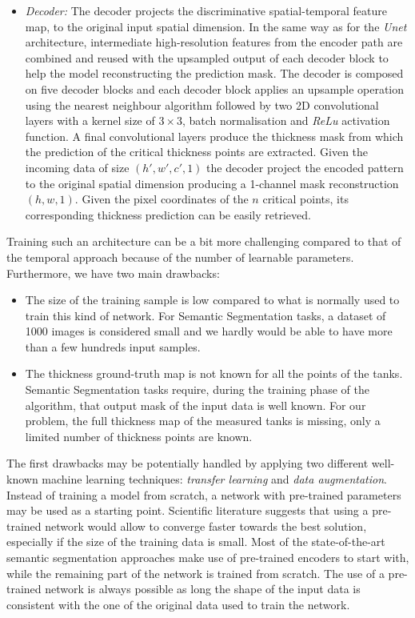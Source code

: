 \begin{itemize}
    \item \textit{Decoder:} The decoder projects the discriminative spatial-temporal feature map, to the original input spatial dimension. In the same way as for the \textit{Unet} architecture, intermediate high-resolution features from the encoder path are combined and reused with the upsampled output of each decoder block to help the model reconstructing the prediction mask. The decoder is composed on five decoder blocks and each decoder block applies an upsample operation using the nearest neighbour algorithm followed by two 2D convolutional layers with a kernel size of $3\times 3$, batch normalisation and \textit{ReLu} activation function. A final convolutional layers produce the thickness mask from which the prediction of the critical thickness points are extracted. Given the incoming data of size $(h', w', c', 1)$ the decoder project the encoded pattern to the original spatial dimension producing a 1-channel mask reconstruction $(h, w, 1)$. Given the pixel coordinates of the $n$ critical points, its corresponding thickness prediction can be easily retrieved.
\end{itemize}

Training such an architecture can be a bit more challenging compared to that of the temporal approach because of the number of learnable parameters. Furthermore, we have two main drawbacks:

\begin{itemize}
    \item The size of the training sample is low compared to what is normally used to train this kind of network. For Semantic Segmentation tasks, a dataset of 1000 images is considered small and we hardly would be able to have more than a few hundreds input samples.
    \item The thickness ground-truth map is not known for all the points of the tanks. Semantic Segmentation tasks require, during the training phase of the algorithm, that output mask of the input data is well known. For our problem, the full thickness map of the measured tanks is missing, only a limited number of thickness points are known.
\end{itemize}

The first drawbacks may be potentially handled by applying two different well-known machine learning techniques: \textit{transfer learning} and \textit{data augmentation}. Instead of training a model from scratch, a network with pre-trained parameters may be used as a starting point. Scientific literature suggests that using a pre-trained network would allow to converge faster towards the best solution, especially if the size of the training data is small. Most of the state-of-the-art semantic segmentation approaches make use of pre-trained encoders to start with, while the remaining part of the network is trained from scratch. The use of a pre-trained network is always possible as long the shape of the input data is consistent with the one of the original data used to train the network. 

